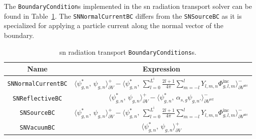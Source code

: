 The \texttt{BoundaryCondition}s implemented in the \acrshort{sn} radiation transport solver can be found in Table~\ref{table:saaf_bcs}. The \texttt{SNNormalCurrentBC} differs from the \texttt{SNSourceBC} as it is specialized for applying a particle current along the normal vector of the boundary. 
\begin{table}[H]
    \centering
    \caption{\acrshort{sn} radiation transport \texttt{BoundaryConditions}s.}
    \begin{tabular}{|c|c|}
        \hline
        \textbf{Name} & \textbf{Expression}\\
        \hline
        \texttt{SNNormalCurrentBC} & $\Bigg\langle \psi_{g,n}^{*},\, \psi_{g,n}\Bigg\rangle_{\partial V}^{+} - \Bigg\langle \psi_{g,n}^{*},\, \sum_{l = 0}^{L^{\text{i}}} \frac{2l + 1}{4\pi} \sum_{m = -l}^{l}Y_{l,m,n}\Phi^{\text{inc}}_{g,l,m}\Bigg\rangle_{\partial V^{\text{src}}}^{-}$ \\
        \texttt{SNReflectiveBC} & $\Bigg\langle \psi_{g,n}^{*},\, \psi_{g,n}\Bigg\rangle_{\partial V}^{+} - \Bigg\langle \psi_{g,n}^{*},\, \alpha_{s,g}\psi_{g,n'}\Bigg\rangle_{\partial V^{\text{ref}}}^{-}$ \\
        \texttt{SNSourceBC} & $\Bigg\langle \psi_{g,n}^{*},\, \psi_{g,n}\Bigg\rangle_{\partial V}^{+} - \Bigg\langle \psi_{g,n}^{*},\, \sum_{l = 0}^{L^{\text{i}}} \frac{2l + 1}{4\pi} \sum_{m = -l}^{l}Y_{l,m,n}\Phi^{\text{inc}}_{g,l,m}\Bigg\rangle_{\partial V^{\text{src}}}^{-}$ \\
        \texttt{SNVacuumBC} & $\Bigg\langle \psi_{g,n}^{*},\, \psi_{g,n}\Bigg\rangle_{\partial V}^{+}$ \\
        \hline
    \end{tabular}
    \label{table:saaf_bcs}
\end{table}

